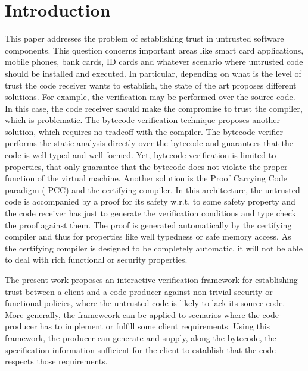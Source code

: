 
\section{Introduction}\label{intro}
This paper addresses the  problem of establishing trust in untrusted software components. This question concerns important areas like 
smart card applications, mobile phones, bank cards, ID cards and whatever scenario where untrusted code should be installed and executed.
In particular, depending on what is the level of trust  the code receiver wants to establish, 
the state of the art proposes different solutions. 
For example, the verification may be performed over the source code. 
In this case, the code receiver should make the compromise to trust the compiler, which is problematic. 
The bytecode verification technique proposes another solution, which requires no tradeoff with the compiler. 
The bytecode verifier performs the static analysis directly over the bytecode and guarantees that 
the code is well typed and well formed. Yet, bytecode verification is limited to properties, that only guarantee that the bytecode does 
not violate the proper function of the virtual machine. Another solution is the Proof Carrying Code paradigm ( PCC) and the certifying compiler.  In this architecture, the untrusted code
is accompanied by a proof for its safety w.r.t. to some safety property and the code receiver has just to generate the 
verification conditions and type check the proof against them. 
The proof is generated automatically by the certifying compiler and thus for properties like well typedness or safe memory access. 
As the certifying compiler is designed to be completely automatic, it will not be able to deal with rich functional or security properties. 
 
The present work proposes an interactive verification framework for establishing trust between a client and a code producer against 
non trivial security or functional  policies, where the untrusted code is likely to lack its source code. 
More generally, the frameweork can be applied to scenarios where the code producer has to implement or fulfill some client requirements.
Using this framework, the producer can generate and supply, along the bytecode, the specification information sufficient for the 
client to establish that the code respects those requirements.    

